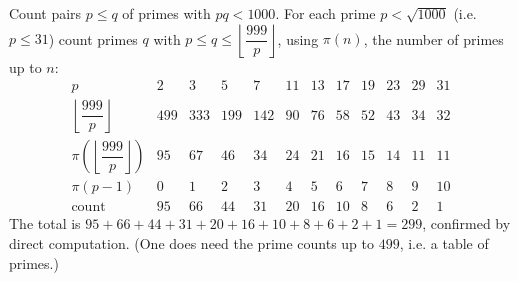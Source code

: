 Count pairs $p\le q$ of primes with $pq<1000$. For each prime $p<\sqrt{1000}$ (i.e. $p\le31$) count primes $q$ with $p\le q\le\left\lfloor\dfrac{999}p\right\rfloor$, using $\pi(n)$, the number of primes up to $n$:
\[\begin{array}{c|ccccccccccc}p&2&3&5&7&11&13&17&19&23&29&31\\\hline\left\lfloor\dfrac{999}p\right\rfloor&499&333&199&142&90&76&58&52&43&34&32\\\pi(\left\lfloor\dfrac{999}p\right\rfloor)&95&67&46&34&24&21&16&15&14&11&11\\\pi(p-1)&0&1&2&3&4&5&6&7&8&9&10\\\hline\text{count}&95&66&44&31&20&16&10&8&6&2&1\end{array}\]
The total is $95+66+44+31+20+16+10+8+6+2+1=\boxed{299}$, confirmed by direct computation. (One does need the prime counts up to $499$, i.e. a table of primes.)
